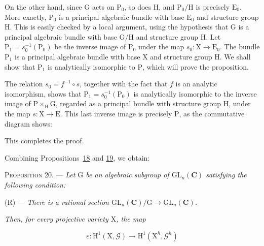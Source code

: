 On the other hand, since $\mathrm{G}$ acts on $\mathrm{P}_0$, so does $\mathrm{H}$, and $\mathrm{P}_0/\mathrm{H}$ is
precisely $\mathrm{E}_0$. More exactly, $\mathrm{P}_0$ is a principal algebraic bundle with
base $\mathrm{E}_0$ and structure group $\mathrm{H}$. This is easily checked by a local
argument, using the hypothesis that $\mathrm{G}$ is a principal algebraic bundle
with base $\mathrm{G}/\mathrm{H}$ and structure group $\mathrm{H}$. Let
$\mathrm{P}_1=s_0^{-1}(\mathrm{P}_0)$ be the inverse image of $\mathrm{P}_0$ under the map
$s_0:\mathrm{X}\to \mathrm{E}_0$. The bundle $\mathrm{P}_1$ is a principal algebraic bundle
with base $\mathrm{X}$ and structure group $\mathrm{H}$. We shall show that $\mathrm{P}_1$ is
analytically isomorphic to $\mathrm{P}$, which will prove the proposition.

The relation $s_0=f^{-1}\circ s$, together with the fact that $f$ is an
analytic isomorphism, shows that $\mathrm{P}_1=s_0^{-1}(\mathrm{P}_0)$ is analytically
isomorphic to the inverse image of $\mathrm{P}\times_\mathrm{H}\mathrm{G}$, regarded as a principal
bundle with structure group $\mathrm{H}$, under the map $s:\mathrm{X}\to \mathrm{E}$. This last
inverse image is precisely $\mathrm{P}$, as the commutative diagram shows:

\begin{center}
\end{center}

This completes the proof.

Combining Propositions~\hyperref[gaga:prop:18]{18} and
\hyperref[gaga:prop:19]{19}, we obtain:

\textsc{Proposition 20}. --- \emph{Let $\mathrm{G}$ be an
algebraic subgroup of $\mathrm{GL}_n(\mathbf{C})$ satisfying the following
condition:}

(R) --- \emph{There is a rational section
$\mathrm{GL}_n(\mathbf{C})/\mathrm{G}\to\mathrm{GL}_n(\mathbf{C})$.}

\emph{Then, for every projective variety $\mathrm{X}$, the map}

\begin{equation*}
\varepsilon:\mathrm{H}^1(\mathrm{X},\mathcal{G})
\longrightarrow\mathrm{H}^1(\mathrm{X}^h,\mathcal{G}^h)
\end{equation*}

